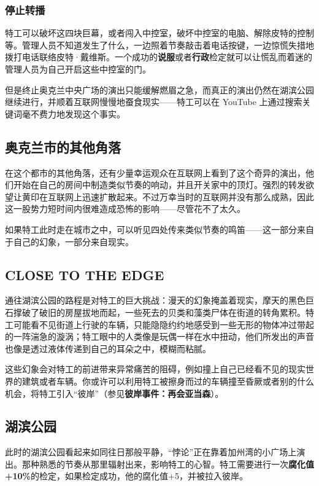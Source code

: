 \subsubsection{停止转播}

特工可以破坏这四块巨幕，或者闯入中控室，破坏中控室的电脑、解除皮特的控制等。管理人员不知道发生了什么，一边照着节奏敲击着电话按键，一边惊慌失措地拨打电话联络皮特·戴维斯。一个成功的\textbf{说服}或者\textbf{行政}检定就可以让慌乱而着迷的管理人员为自己开启这些中控室的门。

但是终止奥克兰中央广场的演出只能缓解燃眉之急，而真正的演出仍然在湖滨公园继续进行，并顺着互联网慢慢地蚕食现实——特工可以在 YouTube 上通过搜索关键词毫不费力地发现这个事实。

\subsection{奥克兰市的其他角落}

在这个都市的其他角落，还有少量幸运观众在互联网上看到了这个奇异的演出，他们开始在自己的房间中制造类似节奏的响动，并且开关家中的顶灯。强烈的转发欲望让黄印在互联网上迅速扩散起来。不过万幸当时的互联网并没有那么成熟，因此这一股势力短时间内很难造成恐怖的影响——尽管花不了太久。

如果特工此时走在城市之中，可以听见四处传来类似节奏的鸣笛——这一部分来自于自己的幻象，一部分来自现实。

\subsection{CLOSE TO THE EDGE}

通往湖滨公园的路程是对特工的巨大挑战：漫天的幻象掩盖着现实，摩天的黑色巨石撑破了破旧的房屋拔地而起，一些死去的贝类和藻类尸体在街道的转角累积。特工可能看不见街道上行驶的车辆，只能隐隐约约地感受到一些无形的物体冲过带起的一阵湍急的漩涡；特工眼中的人类像是玩偶一样在水中扭动，他们所发出的声音也像是透过液体传递到自己的耳朵之中，模糊而粘腻。

这些幻象会对特工的前进带来异常痛苦的阻碍，例如撞上自己已经看不见的现实世界的建筑或者车辆。你或许可以利用特工被擦身而过的车辆撞至昏厥或者别的什么机会，将特工引入“彼岸”（参见\textbf{彼岸事件：再会亚当森}）。

\subsection{湖滨公园}

此时的湖滨公园看起来如同往日那般平静，“悖论”正在靠着加州湾的小广场上演出。那种熟悉的节奏从那里辐射出来，影响特工的心智。特工需要进行一次\textbf{腐化值+10\%}的检定，如果检定成功，他的腐化值+5，并被拉入彼岸。

